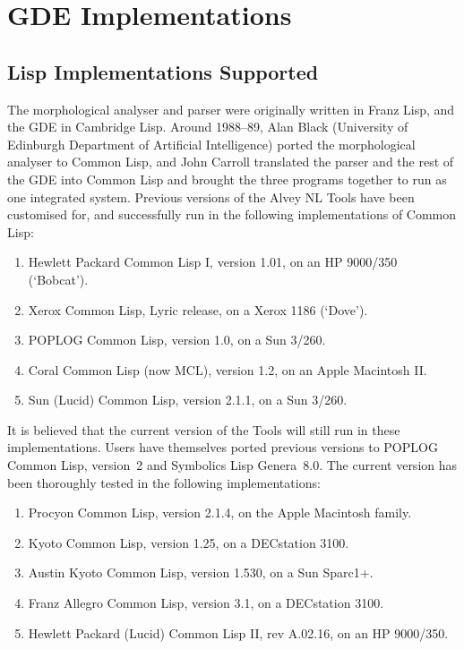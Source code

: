 \chapter{GDE Implementations}

\section{Lisp Implementations Supported}

The morphological analyser and parser were originally written in Franz
Lisp, and the GDE in Cambridge Lisp. Around 1988--89,
Alan Black (University of Edinburgh Department of Artificial Intelligence)
ported the morphological analyser to Common Lisp, and John Carroll translated
the parser and the rest of the GDE into Common Lisp and brought the three
programs together to run as one integrated system. Previous versions
of the Alvey NL Tools have been customised for, and successfully run in the
following implementations of Common Lisp:

\begin{enumerate}
\item Hewlett Packard Common Lisp I, version 1.01, on an HP 9000/350 (`Bobcat').

\item Xerox Common Lisp, Lyric release, on a Xerox 1186 (`Dove').

\item POPLOG Common Lisp, version 1.0, on a Sun 3/260.

\item Coral Common Lisp (now MCL), version 1.2, on an Apple Macintosh II.

\item Sun (Lucid) Common Lisp, version 2.1.1, on a Sun 3/260.
\end{enumerate}

It is believed that the current version of the Tools will still run in
these implementations. Users have themselves ported previous versions
to POPLOG Common Lisp, version~2 and Symbolics Lisp Genera~8.0.
The current version has been thoroughly tested in the following
implementations:

\begin{enumerate}
\item Procyon Common Lisp, version 2.1.4, on the Apple Macintosh family.

\item Kyoto Common Lisp, version 1.25, on a DECstation 3100.

\item Austin Kyoto Common Lisp, version 1.530, on a Sun Sparc1+.

\item Franz Allegro Common Lisp, version 3.1, on a DECstation 3100.

\item Hewlett Packard (Lucid) Common Lisp II, rev A.02.16, on an HP 9000/350.
\end{enumerate}

